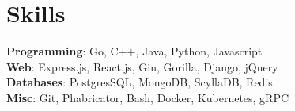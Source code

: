 \section*{\sc Skills}
\vspace{-2mm}
\hrulefill
\vspace{1mm}

\textbf{Programming}: Go, C++, Java, Python, Javascript\\
\textbf{Web}: Express.js, React.js, Gin, Gorilla, Django, jQuery\\
\textbf{Databases}: PostgresSQL, MongoDB, ScyllaDB, Redis\\
\textbf{Misc}: Git, Phabricator, Bash, Docker, Kubernetes, gRPC \\
